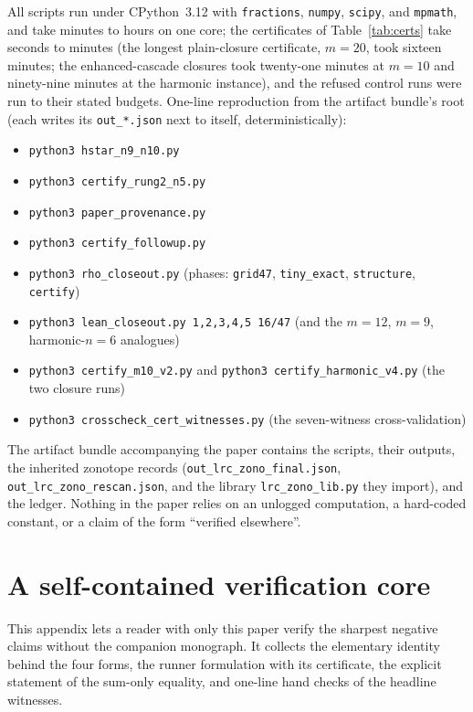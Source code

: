 \documentclass[11pt,a4paper]{article}
\numberwithin{equation}{section}
\theoremstyle{plain}
\theoremstyle{definition}
\theoremstyle{remark}
\begin{document}
All scripts run under CPython~3.12 with \texttt{fractions},
\texttt{numpy}, \texttt{scipy}, and \texttt{mpmath}, and take minutes
to hours on one core; the certificates of Table~\ref{tab:certs} take
seconds to minutes (the longest plain-closure certificate, $m=20$, took
sixteen minutes; the enhanced-cascade closures took twenty-one minutes
at $m=10$ and ninety-nine minutes at the harmonic instance), and the
refused control runs were run to their stated
budgets. One-line reproduction from the artifact bundle's root (each
writes its \texttt{out\_*.json} next to itself, deterministically):
\begin{itemize}[leftmargin=2.2em,itemsep=1pt,topsep=2pt]
\item \texttt{python3 hstar\_n9\_n10.py}
\item \texttt{python3 certify\_rung2\_n5.py}
\item \texttt{python3 paper\_provenance.py}
\item \texttt{python3 certify\_followup.py}
\item \texttt{python3 rho\_closeout.py} (phases: \texttt{grid47},
\texttt{tiny\_exact}, \texttt{structure}, \texttt{certify})
\item \texttt{python3 lean\_closeout.py 1,2,3,4,5 16/47} (and the
$m=12$, $m=9$, harmonic-$n=6$ analogues)
\item \texttt{python3 certify\_m10\_v2.py} and
\texttt{python3 certify\_harmonic\_v4.py} (the two closure runs)
\item \texttt{python3 crosscheck\_cert\_witnesses.py} (the
seven-witness cross-validation)
\end{itemize} The artifact
bundle accompanying the paper contains the scripts, their outputs,
the inherited zonotope records
(\texttt{out\_lrc\_zono\_final.json},
\texttt{out\_lrc\_zono\_rescan.json}, and the library
\texttt{lrc\_zono\_lib.py} they import), and the ledger. Nothing in the
paper relies on an unlogged computation, a hard-coded constant, or a
claim of the form ``verified elsewhere''.


\section{A self-contained verification core}\label{sec:self}

This appendix lets a reader with only this paper verify the sharpest
negative claims without the companion monograph. It collects the
elementary identity behind the four forms, the runner formulation with
its certificate, the explicit statement of the sum-only equality, and
one-line hand checks of the headline witnesses.
\end{document}
